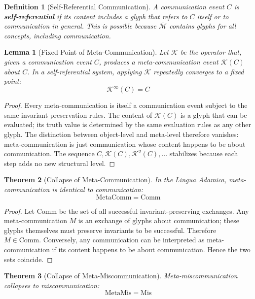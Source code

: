 \documentclass[12pt, letterpaper]{book}
\def\equiv{=}%
\newtheorem{theorem}{Theorem}[chapter]
\newtheorem{lemma}[theorem]{Lemma}
\newtheorem{definition}{Definition}[chapter]
\begin{document}
\begin{definition}[Self-Referential Communication]\label{def:selfref-comm}
A communication event $C$ is \textbf{self-referential} if its content includes a glyph that refers to $C$ itself or to communication in general. This is possible because $\overline{\mathcal{M}}$ contains glyphs for all concepts, including communication.
\end{definition}

\begin{lemma}[Fixed Point of Meta-Communication]\label{lem:metacomm-fp}
Let $\mathcal{K}$ be the operator that, given a communication event $C$, produces a meta-communication event $\mathcal{K}(C)$ about $C$. In a self-referential system, applying $\mathcal{K}$ repeatedly converges to a fixed point:
\[
\mathcal{K}^\infty(C) = C
\]
\end{lemma}

\begin{proof}
Every meta-communication is itself a communication event subject to the same invariant-preservation rules. The content of $\mathcal{K}(C)$ is a glyph that can be evaluated; its truth value is determined by the same evaluation rules as any other glyph. The distinction between object-level and meta-level therefore vanishes: meta-communication is just communication whose content happens to be about communication. The sequence $C, \mathcal{K}(C), \mathcal{K}^2(C), \ldots$ stabilizes because each step adds no new structural level.
\end{proof}

\begin{theorem}[Collapse of Meta-Communication]\label{thm:metacomm-collapse}
In the Lingua Adamica, meta-communication is identical to communication:
\[
\mathrm{MetaComm} \equiv \mathrm{Comm}
\]
\end{theorem}

\begin{proof}
Let $\mathrm{Comm}$ be the set of all successful invariant-preserving exchanges. Any meta-communication $M$ is an exchange of glyphs about communication; these glyphs themselves must preserve invariants to be successful. Therefore $M \in \mathrm{Comm}$. Conversely, any communication can be interpreted as meta-communication if its content happens to be about communication. Hence the two sets coincide.
\end{proof}

\begin{theorem}[Collapse of Meta-Miscommunication]\label{thm:metamis-collapse}
Meta-miscommunication collapses to miscommunication:
\[
\mathrm{MetaMis} \equiv \mathrm{Mis}
\]
\end{theorem}
\end{document}
